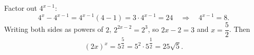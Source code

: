 Factor out $4^{x-1}$:
\[
4^x-4^{x-1}=4^{x-1}(4-1)=3\cdot4^{x-1}=24\quad\Longrightarrow\quad 4^{x-1}=8 .
\]
Writing both sides as powers of $2$, $2^{2x-2}=2^3$, so $2x-2=3$ and $x=\dfrac{5}{2}$. Then
\[
(2x)^x=5^{\dfrac{5}{2}}=5^2\cdot5^{\dfrac{1}{2}}=\boxed{25\sqrt5}.
\]
